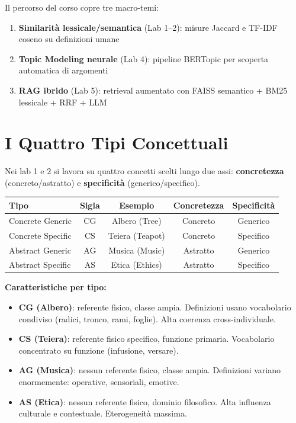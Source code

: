\documentclass[12pt,a4paper]{article}
\begin{document}
\medskip
Il percorso del corso copre tre macro-temi:
\begin{enumerate}
  \item \textbf{Similarit\`a lessicale/semantica} (Lab 1--2): misure Jaccard e TF-IDF coseno su definizioni umane
  \item \textbf{Topic Modeling neurale} (Lab 4): pipeline BERTopic per scoperta automatica di argomenti
  \item \textbf{RAG ibrido} (Lab 5): retrieval aumentato con FAISS semantico + BM25 lessicale + RRF + LLM
\end{enumerate}

\section{I Quattro Tipi Concettuali}

Nei lab 1 e 2 si lavora su quattro concetti scelti lungo due assi: \textbf{concretezza} (concreto/astratto) e \textbf{specificit\`a} (generico/specifico).

\begin{center}
\begin{tabular}{lcccc}
\toprule
\textbf{Tipo} & \textbf{Sigla} & \textbf{Esempio} & \textbf{Concretezza} & \textbf{Specificit\`a}\\
\midrule
Concrete Generic   & CG & Albero (Tree)  & Concreto  & Generico \\
Concrete Specific  & CS & Teiera (Teapot) & Concreto  & Specifico \\
Abstract Generic   & AG & Musica (Music)  & Astratto  & Generico \\
Abstract Specific  & AS & Etica (Ethics)  & Astratto  & Specifico \\
\bottomrule
\end{tabular}
\end{center}

\begin{defbox}
\textbf{Caratteristiche per tipo:}
\begin{itemize}
  \item \textbf{CG (Albero)}: referente fisico, classe ampia. Definizioni usano vocabolario condiviso (radici, tronco, rami, foglie). Alta coerenza cross-individuale.
  \item \textbf{CS (Teiera)}: referente fisico specifico, funzione primaria. Vocabolario concentrato su funzione (infusione, versare).
  \item \textbf{AG (Musica)}: nessun referente fisico, classe ampia. Definizioni variano enormemente: operative, sensoriali, emotive.
  \item \textbf{AS (Etica)}: nessun referente fisico, dominio filosofico. Alta influenza culturale e contestuale. Eterogeneit\`a massima.
\end{itemize}
\end{defbox}
\end{document}
